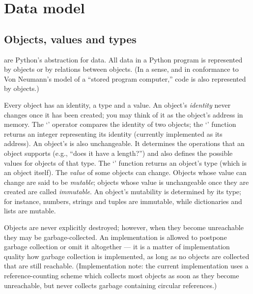\chapter{Data model\label{datamodel}}

\section{Objects, values and types\label{objects}}

 are Python's abstraction for data.  All data in a Python
program is represented by objects or by relations between objects.
(In a sense, and in conformance to Von Neumann's model of a
``stored program computer,'' code is also represented by objects.)

Every object has an identity, a type and a value.  An object's
\emph{identity} never changes once it has been created; you may think
of it as the object's address in memory.  The `' operator
compares the identity of two objects; the `' function
returns an integer representing its identity (currently implemented as
its address).
An object's  is
also unchangeable.  It determines the operations that an object
supports (e.g., ``does it have a length?'') and also defines the
possible values for objects of that type.  The `'
function returns an object's type (which is an object itself).
The \emph{value} of some
objects can change.  Objects whose value can change are said to be
\emph{mutable}; objects whose value is unchangeable once they are
created are called \emph{immutable}.
An object's mutability is determined by its type; for instance,
numbers, strings and tuples are immutable, while dictionaries and
lists are mutable.

Objects are never explicitly destroyed; however, when they become
unreachable they may be garbage-collected.  An implementation is
allowed to postpone garbage collection or omit it altogether --- it is a
matter of implementation quality how garbage collection is
implemented, as long as no objects are collected that are still
reachable.  (Implementation note: the current implementation uses a
reference-counting scheme which collects most objects as soon as they
become unreachable, but never collects garbage containing circular
references.)

